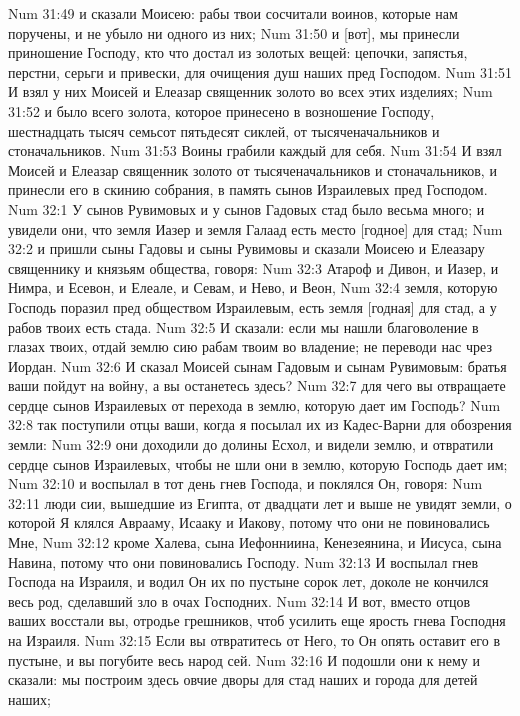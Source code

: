 Num 31:49  и сказали Моисею: рабы твои сосчитали воинов, которые нам поручены, и не убыло ни одного из них;
Num 31:50  и [вот], мы принесли приношение Господу, кто что достал из золотых вещей: цепочки, запястья, перстни, серьги и привески, для очищения душ наших пред Господом.
Num 31:51  И взял у них Моисей и Елеазар священник золото во всех этих изделиях;
Num 31:52  и было всего золота, которое принесено в возношение Господу, шестнадцать тысяч семьсот пятьдесят сиклей, от тысяченачальников и стоначальников.
Num 31:53  Воины грабили каждый для себя.
Num 31:54  И взял Моисей и Елеазар священник золото от тысяченачальников и стоначальников, и принесли его в скинию собрания, в память сынов Израилевых пред Господом.
Num 32:1  У сынов Рувимовых и у сынов Гадовых стад было весьма много; и увидели они, что земля Иазер и земля Галаад есть место [годное] для стад;
Num 32:2  и пришли сыны Гадовы и сыны Рувимовы и сказали Моисею и Елеазару священнику и князьям общества, говоря:
Num 32:3  Атароф и Дивон, и Иазер, и Нимра, и Есевон, и Елеале, и Севам, и Нево, и Веон,
Num 32:4  земля, которую Господь поразил пред обществом Израилевым, есть земля [годная] для стад, а у рабов твоих есть стада.
Num 32:5  И сказали: если мы нашли благоволение в глазах твоих, отдай землю сию рабам твоим во владение; не переводи нас чрез Иордан.
Num 32:6  И сказал Моисей сынам Гадовым и сынам Рувимовым: братья ваши пойдут на войну, а вы останетесь здесь?
Num 32:7  для чего вы отвращаете сердце сынов Израилевых от перехода в землю, которую дает им Господь?
Num 32:8  так поступили отцы ваши, когда я посылал их из Кадес-Варни для обозрения земли:
Num 32:9  они доходили до долины Есхол, и видели землю, и отвратили сердце сынов Израилевых, чтобы не шли они в землю, которую Господь дает им;
Num 32:10  и воспылал в тот день гнев Господа, и поклялся Он, говоря:
Num 32:11  люди сии, вышедшие из Египта, от двадцати лет и выше не увидят земли, о которой Я клялся Аврааму, Исааку и Иакову, потому что они не повиновались Мне,
Num 32:12  кроме Халева, сына Иефонниина, Кенезеянина, и Иисуса, сына Навина, потому что они повиновались Господу.
Num 32:13  И воспылал гнев Господа на Израиля, и водил Он их по пустыне сорок лет, доколе не кончился весь род, сделавший зло в очах Господних.
Num 32:14  И вот, вместо отцов ваших восстали вы, отродье грешников, чтоб усилить еще ярость гнева Господня на Израиля.
Num 32:15  Если вы отвратитесь от Него, то Он опять оставит его в пустыне, и вы погубите весь народ сей.
Num 32:16  И подошли они к нему и сказали: мы построим здесь овчие дворы для стад наших и города для детей наших;
